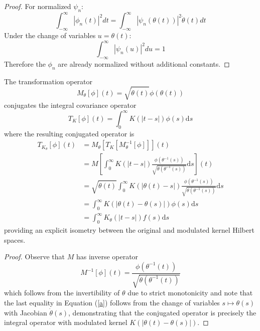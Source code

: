 \documentclass{mc}
\newcommand{\mathd}{\mathrm{d}}
\begin{document}
\begin{proof}
  For normalized $\psi_n$:
  \begin{equation}
    \int_{- \infty}^{\infty} | \phi_n (t) |^2 dt = \int_{- \infty}^{\infty} |
    \psi_n (\theta (t)) |^2 \dot{\theta} (t) dt
  \end{equation}
  Under the change of variables $u = \theta (t)$:
  \begin{equation}
    \int_{- \infty}^{\infty} | \psi_n (u) |^2 du = 1
  \end{equation}
  Therefore the $\phi_n$ are already normalized without additional constants.
\end{proof}

\begin{theorem}
  The transformation operator
  \begin{equation}
    M_{\theta} [\phi] (t) = \sqrt{\dot{\theta} (t)} \phi (\theta (t))
  \end{equation}
  conjugates the integral covariance operator
  \begin{equation}
    T_K [\phi] (t) = \int_0^{\infty} K (|t - s|) \phi (s) \mathd s
  \end{equation}
  where the resulting conjugated operator is
  \begin{equation}
    \begin{array}{ll}
      T_{K_{\theta}}  [\phi] (t) & {= M_{\theta}}  [T_K [M_{\theta}^{- 1}
      [\phi]]] (t)\\
      & = M \left[ \int_0^{\infty} K (|t - s|) \frac{\phi (\theta^{- 1}
      (s))}{\sqrt{\dot{\theta} (\theta^{- 1} (s))}} \mathd s \right] (t)\\
      & = \sqrt{\dot{\theta} (t)}  \int_0^{\infty} K (| \theta (t) - s|)
      \frac{\phi (\theta^{- 1} (s))}{\sqrt{\dot{\theta} (\theta^{- 1} (s))}}
      \mathd s\\
      & = \int_0^{\infty} K (| \theta (t) - \theta (s) |) \phi (s) \mathd s\\
      & = \int_0^{\infty} K_{\theta} (| t - s |) f (s) \mathd s
    \end{array} \label{a}
  \end{equation}
  providing an explicit isometry between the original and modulated kernel
  Hilbert spaces.
\end{theorem}

\begin{proof}
  Observe that $M$ has inverse operator
  \begin{equation}
    M^{- 1} [\phi] (t) = \frac{\phi (\theta^{- 1} (t))}{\sqrt{\dot{\theta}
    (\theta^{- 1} (t))}}
  \end{equation}
  which follows from the invertibility of $\theta$ due to strict monotonicity
  and note that the last equality in Equation (\ref{a}) follows from the
  change of variables $s \mapsto \theta (s)$ with Jacobian $\dot{\theta} (s)$,
  demonstrating that the conjugated operator is precisely the integral
  operator with modulated kernel $K (| \theta (t) - \theta (s) |)$.
\end{proof}
\end{document}
